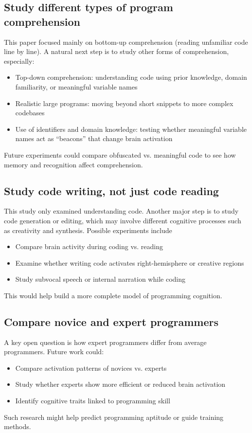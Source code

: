 \subsection{Study different types of program comprehension}

This paper focused mainly on bottom-up comprehension (reading unfamiliar code line by line). A natural next step is to study other forms of comprehension, especially:
\begin{itemize}
    \item Top-down comprehension: understanding code using prior knowledge, domain familiarity, or meaningful variable names
    \item Realistic large programs: moving beyond short snippets to more complex codebases
    \item Use of identifiers and domain knowledge: testing whether meaningful variable names act as “beacons” that change brain activation
\end{itemize}
Future experiments could compare obfuscated vs. meaningful code to see how memory and recognition affect comprehension.

\subsection{Study code writing, not just code reading}

This study only examined understanding code. Another major step is to study code generation or editing, which may involve different cognitive processes such as creativity and synthesis. Possible experiments include
\begin{itemize}
    \item Compare brain activity during coding vs. reading
    \item Examine whether writing code activates right-hemisphere or creative regions
    \item Study subvocal speech or internal narration while coding
\end{itemize}
This would help build a more complete model of programming cognition.

\subsection{Compare novice and expert programmers}

A key open question is how expert programmers differ from average programmers. Future work could:
\begin{itemize}
    \item Compare activation patterns of novices vs. experts
    \item Study whether experts show more efficient or reduced brain activation
    \item Identify cognitive traits linked to programming skill
\end{itemize}
Such research might help predict programming aptitude or guide training methods.

